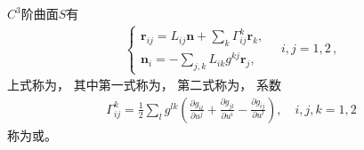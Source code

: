 \begin{theorem}
    $C^3$阶曲面$S$有
    \begin{align}\label{eq:03ex01.35}
        \left\{\begin{array}{l}
            \displaystyle\bm r_{ij}=L_{ij}\bm n+\sum\limits_{k}{\varGamma_{ij}^k\bm r_k}, \\
            \displaystyle\bm n_i=-\sum\limits_{j,k}{L_{ik}g^{kj}\bm r_j},
        \end{array}\right.\quad i,j=1,2\, ,
    \end{align}
    上式称为，
    其中第一式称为，
    第二式称为，
    系数
    \begin{align}\label{eq:03ex01.36}
        \varGamma_{ij}^k=\frac{1}{2}\sum\limits_{l}{g^{lk}\left(\frac{\partial g_{il}}{\partial u^j}+\frac{\partial g_{jl}}{\partial u^i}-\frac{\partial g_{ij}}{\partial u^l}\right)},\quad i,j,k=1,2
    \end{align}
    称为或。
\end{theorem}
